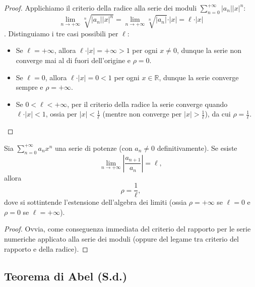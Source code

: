 \pencilnote{Esempio: per la serie $\sum_{n=1}^{\infty} \frac{x^n}{n}$ si ha $a_n = \frac{1}{n}$, da cui $\frac{1}{\rho} = \lim_{n \to +\infty} \frac{1}{\sqrt[n]{n}} = 1 \implies \rho = 1$, quindi $X \supseteq ]-1, 1[$.}

\begin{proof}
Applichiamo il criterio della radice alla serie dei moduli $\sum_{n=0}^{+\infty} \vert a_n \vert \vert x \vert^n$:
\[
\lim_{n \to +\infty} \sqrt[n]{\vert a_n \vert \vert x \vert^n} = \lim_{n \to +\infty} \sqrt[n]{\vert a_n \vert} \cdot \vert x \vert = \ell \cdot \vert x \vert
\]
. Distinguiamo i tre casi possibili per $\ell$:
\begin{itemize}
    \item Se $\ell = +\infty$, allora $\ell \cdot \vert x \vert = +\infty > 1$ per ogni $x \neq 0$, dunque la serie non converge mai al di fuori dell'origine e $\rho = 0$.
    \item Se $\ell = 0$, allora $\ell \cdot \vert x \vert = 0 < 1$ per ogni $x \in \mathbb{R}$, dunque la serie converge sempre e $\rho = +\infty$.
    \item Se $0 < \ell < +\infty$, per il criterio della radice la serie converge quando $\ell \cdot \vert x \vert < 1$, ossia per $\vert x \vert < \frac{1}{\ell}$ (mentre non converge per $\vert x \vert > \frac{1}{\ell}$), da cui $\rho = \frac{1}{\ell}$.
\end{itemize}
\end{proof}

\begin{theorem}
Sia $\sum_{n=0}^{+\infty} a_n x^n$ una serie di potenze (con $a_n \neq 0$ definitivamente). Se esiste
\[
\lim_{n \to +\infty} \left\vert \frac{a_{n+1}}{a_n} \right\vert = \ell,
\]
allora
\[
\rho = \frac{1}{\ell},
\]
dove si sottintende l'estensione dell'algebra dei limiti (ossia $\rho = +\infty$ se $\ell = 0$ e $\rho = 0$ se $\ell = +\infty$).
\end{theorem}

\begin{proof}
Ovvia, come conseguenza immediata del criterio del rapporto per le serie numeriche applicato alla serie dei moduli (oppure del legame tra criterio del rapporto e della radice).
\end{proof}

\subsection{Teorema di Abel (S.d.)}


